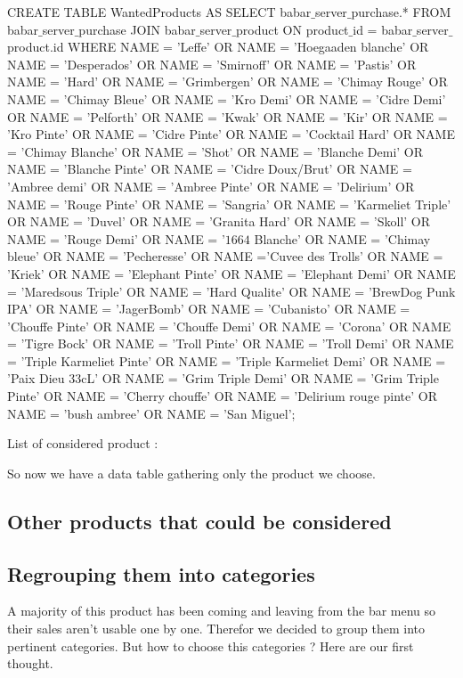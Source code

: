 \documentclass{report}
\begin{document}
CREATE TABLE WantedProducts AS
    SELECT babar$\_$server$\_$purchase.* FROM babar$\_$server$\_$purchase JOIN babar$\_$server$\_$product ON product$\_$id = babar$\_$server$\_$product.id WHERE NAME = 'Leffe' OR NAME = 'Hoegaaden blanche' OR NAME = 'Desperados' OR NAME = 'Smirnoff' OR NAME = 'Pastis' OR NAME = 'Hard' OR NAME = 'Grimbergen' OR NAME = 'Chimay Rouge' OR NAME = 'Chimay Bleue' OR NAME = 'Kro Demi' OR NAME = 'Cidre Demi' OR NAME = 'Pelforth' OR NAME = 'Kwak' OR NAME = 'Kir' OR NAME = 'Kro Pinte' OR NAME = 'Cidre Pinte' OR NAME = 'Cocktail Hard' OR NAME = 'Chimay Blanche' OR NAME = 'Shot'  OR NAME = 'Blanche Demi' OR NAME = 'Blanche Pinte' OR NAME = 'Cidre Doux/Brut' OR NAME = 'Ambree demi' OR NAME = 'Ambree Pinte'  OR NAME = 'Delirium' OR NAME = 'Rouge Pinte' OR NAME = 'Sangria' OR NAME = 'Karmeliet Triple' OR NAME = 'Duvel' OR NAME = 'Granita Hard' OR NAME = 'Skoll' OR NAME = 'Rouge Demi' OR NAME = '$1664$ Blanche' OR NAME = 'Chimay bleue' OR NAME = 'Pecheresse' OR NAME ='Cuvee des Trolls'  OR NAME = 'Kriek' OR NAME = 'Elephant Pinte' OR NAME = 'Elephant Demi' OR NAME = 'Maredsous Triple' OR NAME = 'Hard Qualite' OR NAME = 'BrewDog Punk IPA' OR NAME = 'JagerBomb' OR NAME = 'Cubanisto' OR NAME = 'Chouffe Pinte' OR NAME = 'Chouffe Demi' OR NAME = 'Corona' OR NAME = 'Tigre Bock' OR NAME = 'Troll Pinte' OR NAME = 'Troll Demi' OR NAME = 'Triple Karmeliet Pinte' OR NAME = 'Triple Karmeliet Demi' OR NAME = 'Paix Dieu $33$cL' OR NAME = 'Grim Triple Demi' OR NAME = 'Grim Triple Pinte' OR NAME = 'Cherry chouffe' OR NAME = 'Delirium rouge pinte' OR NAME = 'bush ambree' OR NAME = 'San Miguel';

List of considered product :

So now we have a data table gathering only the product we choose.

\subsection{Other products that could be considered}

\subsection{Regrouping them into categories}

A majority of this product has been coming and leaving from the bar menu so their sales aren't usable one by one. Therefor we decided to group them into pertinent categories. But how to choose this categories ? Here are our first thought.
\end{document}
